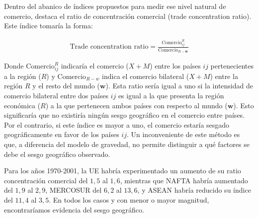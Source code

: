 \documentclass[10pt,a4paper]{article}
\begin{document}
Dentro del abanico de índices propuestos para medir ese nivel natural de comercio, destaca el ratio de concentración comercial (trade concentration ratio). Este índice tomaría la forma: 

$$\begin{aligned}
    \text{Trade concentration ratio}=\frac{\text{Comercio}_{ij}^R}{\text{Comercio}_{R-\mathbf w}}
\end{aligned}$$

Donde $\text{Comercio}_{ij}^R$ indicaría el comercio ($X+M$) entre los países $ij$ pertenecientes a la región ($R$) y $\text{Comercio}_{R-w}$ indica el comercio bilateral ($X+M$) entre la región $R$ y el resto del mundo ($\mathbf w$). Esta ratio sería igual a uno si la intensidad de comercio bilateral entre dos países $ij$ es igual a la que presenta la región económica ($R$) a la que pertenecen ambos países con respecto al mundo ($\mathbf w$). Esto significaría que no existiría ningún sesgo geográfico en el comercio entre países. Por el contrario, si este índice es mayor a uno, el comercio estaría sesgado geográficamente en favor de los países $ij$. Un inconveniente de este método es que, a diferencia del modelo de gravedad, no permite distinguir a qué factores se debe el sesgo geográfico observado. 

Para los años 1970-2001, la UE habría experimentado un aumento de su ratio concentración comercial del $1,5$ al $1,6$, mientras que NAFTA habría aumentado del $1,9$ al $2,9$, MERCOSUR del $6,2$ al $13,6$, y ASEAN habría reducido su índice del $11,4$ al $3,5$. En todos los casos y con menor o mayor magnitud, encontraríamos evidencia del sesgo geográfico.
\end{document}
